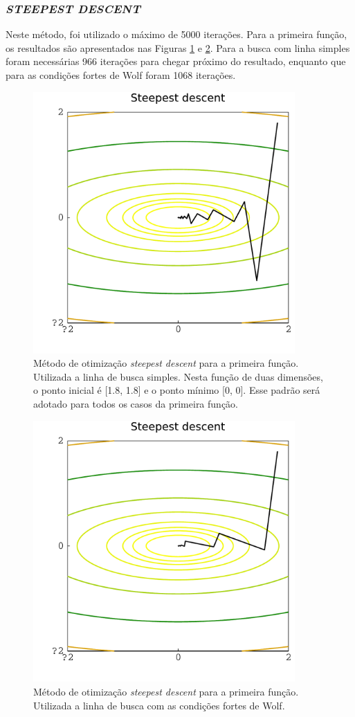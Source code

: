 \documentclass[12pt]{article}
\begin{document}
\subsubsection{\textit{STEEPEST DESCENT}}
Neste método, foi utilizado o máximo de 5000 iterações. Para a primeira função, os resultados são apresentados nas Figuras \ref{fig:steep1f} e \ref{fig:steep2f}. Para a busca com linha simples foram necessárias 966 iterações para chegar próximo do resultado, enquanto que para as condições fortes de Wolf foram 1068 iterações.
\begin{figure}[ht!]
	\centering
	\includegraphics[width=10cm]{Figuras/Steepest_descent_linef2}
		\caption{Método de otimização \textit{steepest descent} para a primeira função. Utilizada a linha de busca simples. Nesta função de duas dimensões, o ponto
			inicial é [1.8, 1.8] e o ponto mínimo [0, 0]. Esse padrão será adotado para todos os casos da primeira função.} 
	\label{fig:steep1f}
\end{figure} 
\begin{figure}[ht!]
	\centering
	\includegraphics[width=10cm]{Figuras/Steepest_descent_wolff2}
		\caption{Método de otimização \textit{steepest descent} para a primeira função. Utilizada a linha de busca com as condições fortes de Wolf.} 
	\label{fig:steep2f}
\end{figure} 
\end{document}

